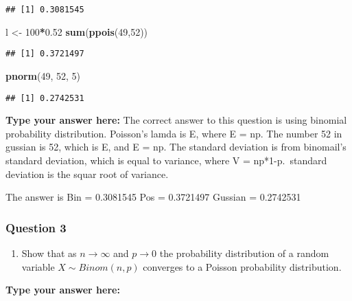 \documentclass[
]{article}
\newenvironment{Shaded}{\begin{snugshade}}{\end{snugshade}}
\newcommand{\DecValTok}[1]{\textcolor[rgb]{0.00,0.00,0.81}{#1}}
\newcommand{\FloatTok}[1]{\textcolor[rgb]{0.00,0.00,0.81}{#1}}
\newcommand{\KeywordTok}[1]{\textcolor[rgb]{0.13,0.29,0.53}{\textbf{#1}}}
\newcommand{\NormalTok}[1]{#1}
\newcommand{\OperatorTok}[1]{\textcolor[rgb]{0.81,0.36,0.00}{\textbf{#1}}}
\newcommand{\StringTok}[1]{\textcolor[rgb]{0.31,0.60,0.02}{#1}}
\providecommand{\tightlist}{%
  \setlength{\itemsep}{0pt}\setlength{\parskip}{0pt}}
\begin{document}
\begin{verbatim}
## [1] 0.3081545
\end{verbatim}

\begin{Shaded}
\begin{Highlighting}[]
\NormalTok{l <-}\StringTok{ }\DecValTok{100}\OperatorTok{*}\FloatTok{0.52}
\KeywordTok{sum}\NormalTok{(}\KeywordTok{ppois}\NormalTok{(}\DecValTok{49}\NormalTok{,}\DecValTok{52}\NormalTok{))}
\end{Highlighting}
\end{Shaded}

\begin{verbatim}
## [1] 0.3721497
\end{verbatim}

\begin{Shaded}
\begin{Highlighting}[]
\KeywordTok{pnorm}\NormalTok{(}\DecValTok{49}\NormalTok{, }\DecValTok{52}\NormalTok{, }\DecValTok{5}\NormalTok{)}
\end{Highlighting}
\end{Shaded}

\begin{verbatim}
## [1] 0.2742531
\end{verbatim}

\textbf{Type your answer here:} The correct answer to this question is
using binomial probability distribution. Poisson's lamda is E, where E =
np. The number 52 in gussian is 52, which is E, and E = np. The standard
deviation is from binomail's standard deviation, which is equal to
variance, where V = np*1-p.~standard deviation is the squar root of
variance.

The answer is Bin = 0.3081545 Pos = 0.3721497 Gussian = 0.2742531

\hypertarget{question-3-2}{%
\subsubsection{Question 3}\label{question-3-2}}

\begin{enumerate}
\def\labelenumi{\alph{enumi}.}
\tightlist
\item
  Show that as \(n\rightarrow \infty\) and \(p\rightarrow 0\) the
  probability distribution of a random variable \(X\sim Binom(n,p)\)
  converges to a Poisson probability distribution.
\end{enumerate}

\textbf{Type your answer here:}
\end{document}
